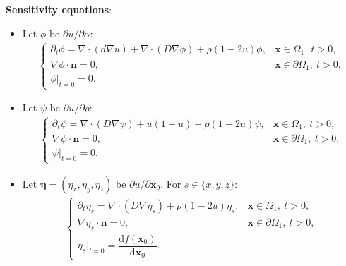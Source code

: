 \documentclass[12pt]{article}
\newcommand{\bn}{\mathbf{n}}
\newcommand{\bx}{\mathbf{x}}
\newcommand{\bmeta}{\bm{\eta}}
\newcommand{\rmd}{\mathrm{d}}
\newcommand{\pp}{\partial}
\begin{document}
\noindent\textbf{Sensitivity equations}:

\begin{itemize}[leftmargin=*,noitemsep,topsep=0pt]
\item Let $\phi$ be $\pp u / \pp \alpha$:
\begin{equation}
\begin{split}
\begin{cases}
    \pp_t \phi = \nabla \cdot (d \nabla u) + \nabla \cdot (D \nabla \phi) + \rho (1 - 2u) \phi, & \bx \in \Omega_1,\ t > 0, \\
    \nabla \phi \cdot \bn = 0, & \bx \in \pp\Omega_1,\ t > 0, \\
    \phi|_{t=0} = 0. &
\end{cases}
\end{split}
\end{equation}

\item Let $\psi$ be $\pp u / \pp \rho$:
\begin{equation}
\begin{split}
\begin{cases}
    \pp_t \psi = \nabla \cdot (D \nabla \psi) + u(1 - u) + \rho (1 - 2u) \psi, & \bx \in \Omega_1,\ t > 0, \\
    \nabla \psi \cdot \bn = 0, & \bx \in \pp\Omega_1,\ t > 0, \\
    \psi|_{t=0} = 0. &
\end{cases}
\end{split}
\end{equation}

\item Let $\bmeta=(\eta_x,\eta_y,\eta_z)$ be $\pp u / \pp \bx_0$. For $s\in\{x,y,z\}$:
\begin{equation}
\begin{split}
\begin{cases}
    \pp_t \eta_s = \nabla \cdot (D \nabla \eta_s) + \rho (1 - 2u) \eta_s, & \bx \in \Omega_1,\ t > 0, \\
    \nabla \eta_s \cdot \bn = 0, & \bx \in \pp\Omega_1,\ t > 0, \\
    \eta_s|_{t=0} = \dfrac{\rmd f(\bx_0)}{\rmd \bx_0}. &
\end{cases}
\end{split}
\end{equation}

\end{itemize}
\end{document}
